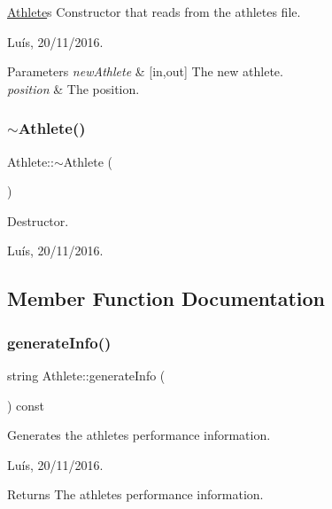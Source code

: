 \hyperlink{class_athlete}{Athlete}\textquotesingle{}s Constructor that reads from the athlete\textquotesingle{}s file. 

Luís, 20/11/2016. 


\begin{DoxyParams}{Parameters}
{\em new\+Athlete} & \mbox{[}in,out\mbox{]} The new athlete. \\
\hline
{\em position} & The position. \\
\hline
\end{DoxyParams}
\hypertarget{class_athlete_a8afd915bce6c257a4f512c97fe42a518}{}\label{class_athlete_a8afd915bce6c257a4f512c97fe42a518} 
\subsubsection{\texorpdfstring{$\sim$\+Athlete()}{~Athlete()}}
{\footnotesize\ttfamily Athlete\+::$\sim$\+Athlete (\begin{DoxyParamCaption}{ }\end{DoxyParamCaption})}



Destructor. 

Luís, 20/11/2016. 

\subsection{Member Function Documentation}
\hypertarget{class_athlete_a44a5a7f1676c6ad2faca9bf51877a6f8}{}\label{class_athlete_a44a5a7f1676c6ad2faca9bf51877a6f8} 
\subsubsection{\texorpdfstring{generate\+Info()}{generateInfo()}}
{\footnotesize\ttfamily string Athlete\+::generate\+Info (\begin{DoxyParamCaption}{ }\end{DoxyParamCaption}) const\hspace{0.3cm}{\ttfamily [virtual]}}



Generates the athlete\textquotesingle{}s performance information. 

Luís, 20/11/2016. 

\begin{DoxyReturn}{Returns}
The athlete\textquotesingle{}s performance information. 
\end{DoxyReturn}


